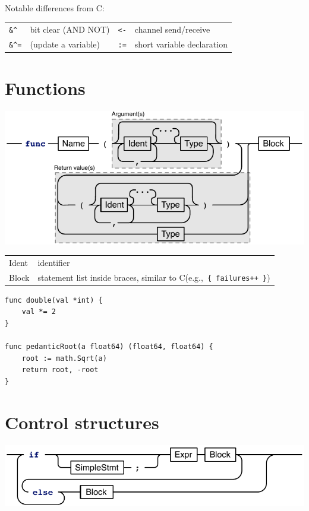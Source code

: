 \documentclass{article}
\begin{document}
\begin{multicols*}{3}
  Notable differences from C:

  \begin{tabular}{llll}
    \texttt{\&\textasciicircum} & bit clear (AND NOT) & \texttt{<-} & channel send/receive \\
    \texttt{\&\textasciicircum=} & (update a variable) & \texttt{:=} & short variable declaration     \\
  \end{tabular}

  \filbreak
  \section*{Functions}

  \includegraphics[width=\linewidth]{func}

  \begin{tabular}{p{0.3in}p{2.7in}}
    Ident &  identifier \\
    Block & statement list inside braces, similar to C\newline(e.g.,~\lstinline!{ failures++ }!)\\
  \end{tabular}

  \vspace{\baselineskip}
\begin{lstlisting}[frame=single]
func double(val *int) {
    val *= 2
}

func pedanticRoot(a float64) (float64, float64) {
    root := math.Sqrt(a)
    return root, -root
}
\end{lstlisting}

  \filbreak
  \section*{Control structures}

  \includegraphics[width=\linewidth]{if}


\end{multicols*}
\end{document}
